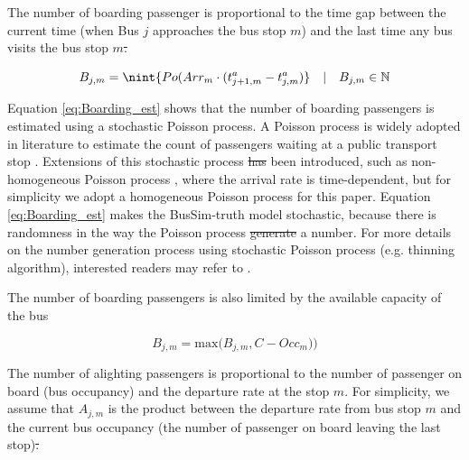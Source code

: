 \documentclass[11pt]{article}
\DeclarePairedDelimiter{\nint}\lfloor\rceil
\providecommand{\DIFaddtex}[1]{{\protect\color{blue}\uwave{#1}}} %
\providecommand{\DIFdeltex}[1]{{\protect\color{red}\sout{#1}}}                      %
\providecommand{\DIFaddbegin}{} %
\providecommand{\DIFaddend}{} %
\providecommand{\DIFdelbegin}{} %
\providecommand{\DIFdelend}{} %
\providecommand{\DIFadd}[1]{\texorpdfstring{\DIFaddtex{#1}}{#1}} %
\providecommand{\DIFdel}[1]{\texorpdfstring{\DIFdeltex{#1}}{}} %
\newcommand{\DIFscaledelfig}{0.5}
\newlength{\DIFdelgraphicswidth} %
\newlength{\DIFdelgraphicsheight} %
\newcommand{\DIFaddincludegraphics}[2][]{{\color{blue}\fbox{\DIFOincludegraphics[#1]{#2}}}} %
\newcommand{\DIFdelincludegraphics}[2][]{%
\sbox{\DIFdelgraphicsbox}{\DIFOincludegraphics[#1]{#2}}%
\settoboxwidth{\DIFdelgraphicswidth}{\DIFdelgraphicsbox} %
\settoboxtotalheight{\DIFdelgraphicsheight}{\DIFdelgraphicsbox} %
\scalebox{\DIFscaledelfig}{%
\parbox[b]{\DIFdelgraphicswidth}{\usebox{\DIFdelgraphicsbox}\\[-\baselineskip] \rule{\DIFdelgraphicswidth}{0em}}\llap{\resizebox{\DIFdelgraphicswidth}{\DIFdelgraphicsheight}{%
\setlength{\unitlength}{\DIFdelgraphicswidth}%
\begin{picture}(1,1)%
\thicklines\linethickness{2pt} %
{\color[rgb]{1,0,0}\put(0,0){\framebox(1,1){}}}%
{\color[rgb]{1,0,0}\put(0,0){\line( 1,1){1}}}%
{\color[rgb]{1,0,0}\put(0,1){\line(1,-1){1}}}%
\end{picture}%
}\hspace*{3pt}}} %
} %
\DeclareRobustCommand{\DIFaddbegin}{\DIFOaddbegin \let\includegraphics\DIFaddincludegraphics} %
\DeclareRobustCommand{\DIFaddend}{\DIFOaddend \let\includegraphics\DIFOincludegraphics} %
\DeclareRobustCommand{\DIFdelbegin}{\DIFOdelbegin \let\includegraphics\DIFdelincludegraphics} %
\DeclareRobustCommand{\DIFdelend}{\DIFOaddend \let\includegraphics\DIFOincludegraphics} %
\begin{document}
The number of boarding passenger is proportional to the time gap between the current time (when Bus $j$ approaches the bus stop $m$) and the last time any bus visits the bus stop $m$\DIFdelbegin \DIFdel{. 
    }%

\DIFdelend \DIFaddbegin \DIFadd{:     
    }\DIFaddend \begin{equation}
        B_{j,m} = \nint{Po(Arr_m \cdot (t^a_{j+1,m}-t^a_{j,m}) } \quad | \quad B_{j,m}\in\mathbb{N}
        \label{eq:Boarding_est}
    \end{equation}

Equation \ref{eq:Boarding_est} shows that the number of boarding passengers is estimated using a stochastic Poisson process. A Poisson process is widely adopted in literature to estimate the count of passengers waiting at a public transport stop \citep{toledo2010mesoscopic,cats2010mesoscopic}. Extensions of this stochastic process \DIFdelbegin \DIFdel{has }\DIFdelend \DIFaddbegin \DIFadd{have }\DIFaddend been introduced, such as non-homogeneous Poisson process \citep{kieu2018stochastic}, where the arrival rate is time-dependent, but for simplicity we adopt a homogeneous Poisson process for this paper. Equation \ref{eq:Boarding_est} makes the BusSim-truth model stochastic, because there is randomness in the way the Poisson process \DIFdelbegin \DIFdel{generate }\DIFdelend \DIFaddbegin \DIFadd{generates }\DIFaddend a number. For more details on the number generation process using stochastic Poisson process (e.g. thinning algorithm), interested readers may refer to \citet{lewis1979simulation}. \DIFdelbegin %

\DIFdelend The number of boarding passengers is also limited by the available capacity of the bus\DIFdelbegin %

\DIFdelend \DIFaddbegin \DIFadd{:
    }\DIFaddend \begin{equation}
        B_{j,m} = \text{max} \big( B_{j,m}, C - Occ_m )   \big)
        \label{eq:Boarding_est}
    \end{equation}

The number of alighting passengers is proportional to the number of passenger on board (bus occupancy) and the departure rate at the stop $m$.  For simplicity, we assume that $A_{j,m}$ is the product between the departure rate from bus stop $m$ and the current bus occupancy (the number of passenger on board leaving the last stop)\DIFdelbegin \DIFdel{. 
}%
\end{document}
